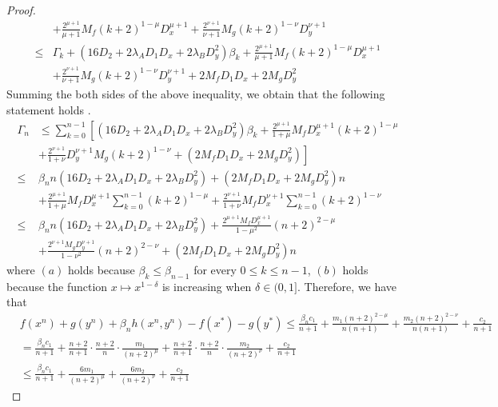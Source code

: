 \documentclass{article}
\numberwithin{equation}{section}
\begin{document}
\begin{proof}
\begin{align}
        &+\frac{2^{\mu+1}}{\mu+1}M_f(k+2)^{1-\mu}D_x^{\mu+1}+\frac{2^{\nu+1}}{\nu+1}M_g(k+2)^{1-\nu}D_y^{\nu+1}\nonumber \\
         \leq& \Gamma_k + (16D_2+2\lambda_{A} D_1D_x+ 2\lambda_{B} D_y^2)\beta_k +\frac{2^{\mu+1}}{\mu+1}M_f(k+2)^{1-\mu}D_x^{\mu+1} \nonumber\\
        &+\frac{2^{\nu+1}}{\nu+1}M_g(k+2)^{1-\nu}D_y^{\nu+1}+2M_fD_1D_x+2M_gD_y^2 
    \end{align}
    Summing the both sides of the above inequality, we obtain that the following statement holds .
    \begin{align}
        \Gamma_n &\leq \sum_{k = 0}^{n-1} \left[ (16D_2+2\lambda_{A} D_1D_x+ 2\lambda_{B} D_y^2)\beta_k +\frac{2^{\mu+1}}{1+\mu}M_fD_x^{\mu+1}(k+2)^{1-\mu }\right. \nonumber \\
        &\left. +\frac{2^{\nu+1}}{1+\nu}D_y^{\nu+1}M_g(k+2)^{1-\nu}+ (2M_fD_1D_x+2M_gD_y^2 ) \right]  \nonumber \\
         \overset{\mathop{(a)}}{\leq}& \beta_{n}n(16D_2+2\lambda_{A} D_1D_x+ 2\lambda_{B} D_y^2) +(2M_fD_1D_x+2M_gD_y^2 )n  \nonumber \\
        &+\frac{2^{\mu+1}}{1+\mu}M_fD_x^{\mu+1}\sum_{k=0}^{n-1}(k+2)^{1-\mu} + \frac{2^{\nu+1}}{1+\nu}M_fD_x^{\nu+1}\sum_{k=0}^{n-1}(k+2)^{1-\nu} \nonumber \\
         \overset{\mathop{(b)}}{\leq}& \beta_{n}n(16D_2+2\lambda_{A} D_1D_x+ 2\lambda_{B} D_y^2)+ \frac{2^{\mu+1}M_fD_x^{\mu+1}}{1-\mu^2}(n+2)^{2-\mu} \nonumber \\
        &+ \frac{2^{\nu+1}M_gD_y^{\nu+1}}{1-\nu^2}(n+2)^{2-\nu}+(2M_fD_1D_x+2M_gD_y^2 )n 
    \end{align}
    where $(a)$ holds because $\beta_{k} \leq \beta_{n-1}$ for every $ 0 \leq k \leq n-1$, $(b)$ holds because the function
    $x \mapsto x^{1-\delta}$ is increasing when $\delta \in (0,1]$. 
    Therefore, we have that
    \begin{align}
        &f(x^n) +g(y^n)+\beta_{n}h(x^n,y^n) -f(x^*)-g(y^*) \leq  \frac{\beta_{n}c_1}{n+1} +\frac{m_1(n+2)^{2-\mu}}{n(n+1)}+\frac{m_2(n+2)^{2-\nu}}{n(n+1)}+ \frac{c_2}{n+1} \nonumber \\
        &= \frac{\beta_{n}c_1}{n+1} +\frac{n+2}{n+1}\cdot\frac{n+2}{n}\cdot\frac{m_1}{(n+2)^{\mu}}+\frac{n+2}{n+1}\cdot\frac{n+2}{n}\cdot\frac{m_2}{(n+2)^{\nu}}+ \frac{c_2}{n+1} \nonumber\\
        &\leq  \frac{\beta_{n}c_1}{n+1} +\frac{6m_1}{(n+2)^{\mu}}+\frac{6m_2}{(n+2)^{\nu}}+ \frac{c_2}{n+1}  
        \label{Fk-F*_leq_holder}

\end{align}
\end{proof}
\end{document}
